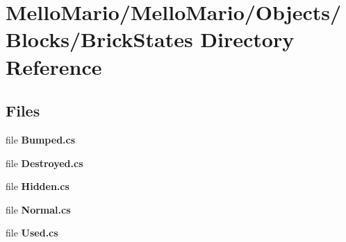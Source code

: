\section{Mello\+Mario/\+Mello\+Mario/\+Objects/\+Blocks/\+Brick\+States Directory Reference}
\label{dir_f60813cced82cd1551f4b1de1133f47b}
\subsection*{Files}
\begin{DoxyCompactItemize}
\item 
file \textbf{ Bumped.\+cs}
\item 
file \textbf{ Destroyed.\+cs}
\item 
file \textbf{ Hidden.\+cs}
\item 
file \textbf{ Normal.\+cs}
\item 
file \textbf{ Used.\+cs}
\end{DoxyCompactItemize}
